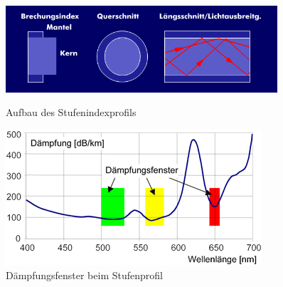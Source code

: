 \begin{figure}[h]
    \begin{center}
        \begin{minipage}[t]{0.4\textwidth}
            \begin{center}
                \includegraphics[width=0.9\textwidth]{Bilder/Optische_Wellenleiter_Die_Polymer_Optische_Faser/Brechzahlprofile/pofsi.png}
                \caption[Aufbau des Stufenindexprofils \newline \url{http://www.itwissen.info/bilder/aufbau-und-brechungsprofil-der-stufenindex-profilfaser.png} (zuletzt aufgerufen am 19.09.2015)]{Aufbau des Stufenindexprofils}
                \label{fig:pofsi}
            \end{center}
        \end{minipage}
        \hspace{0.025\textwidth}
        \begin{minipage}[t]{0.4\textwidth}
            \begin{center}
                \includegraphics[height=0.1\textheight]{Bilder/Optische_Wellenleiter_Die_Polymer_Optische_Faser/Funktionsweise/pofdaempfung.png}
                \caption[Dämpfungsfenster bei einer polymer optischen Faser \newline \url{http://www.pofac.fh-nuernberg.de/pofac/de/was_sind_pof/images/pmma_daempfung.png} (zuletzt aufgerufen am 19.09.2015)]{Dämpfungsfenster beim Stufenprofil}
                \label{fig:pofdaempfung}
            \end{center}
        \end{minipage}
    \end{center}
\end{figure}

